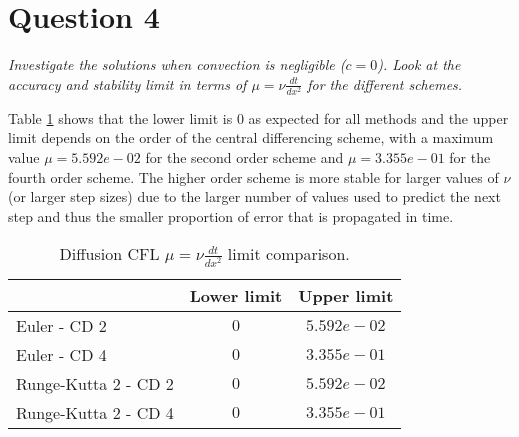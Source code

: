 \section*{Question 4}
\emph{Investigate the solutions when convection is negligible ($c = 0$). Look at the accuracy and stability limit in terms of $\mu = \nu \tfrac{dt}{dx^2}$ for the different schemes.}

Table \ref{tbl1} shows that the lower limit is $0$ as expected for all methods and the upper limit depends on the order of the central differencing scheme, with a maximum value $\mu = 5.592e-02$ for the second order scheme and $\mu = 3.355e-01$ for the fourth order scheme. The higher order scheme is more stable for larger values of $\nu$ (or larger step sizes) due to the larger number of values used to predict the next step and thus the smaller proportion of error that is propagated in time.

\begin{table}[!ht]
\caption{Diffusion CFL $\mu = \nu \tfrac{dt}{dx^2}$ limit comparison.}
\label{tbl1}
\centering
\begin{tabular}{l|c|c}
& Lower limit & Upper limit \\
\hline
Euler - CD 2 & $0$ & $5.592e-02$ \\
\hline
Euler - CD 4 & $0$ & $3.355e-01$ \\
\hline
Runge-Kutta 2 - CD 2 & $0$ & $5.592e-02$\\
\hline
Runge-Kutta 2 - CD 4 & $0$ & $3.355e-01$ \\
\hline
\end{tabular}
\end{table}
